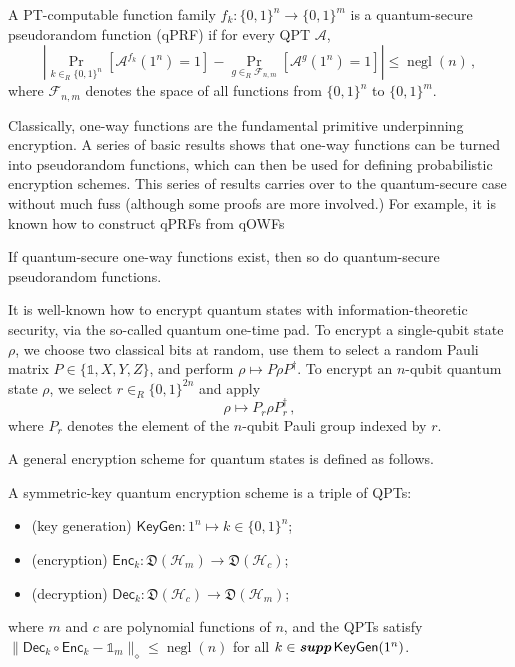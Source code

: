 \documentclass[envcountsame]{llncs}
\numberwithin{equation}{section}
\newcommand{\one}{\mathds 1}
\newcommand{\opn}{\operatorname}
\newcommand{\algo}{\mathcal}
\newcommand{\negl}{\opn{negl}}
\newcommand{\KeyGen}{\ensuremath{\mathsf{KeyGen}}\xspace}
\newcommand{\Enc}{\ensuremath{\mathsf{Enc}}\xspace}
\newcommand{\Dec}{\ensuremath{\mathsf{Dec}}\xspace}
\newcommand{\inrand}{\in_R}
\newcommand{\prob}{\opn{Pr}}
\newcommand{\states}{\mathfrak D}
\newcommand\supp{\textbf{supp}}
\begin{document}
\begin{definition}\label{def:quantum-secure-prf}
A PT-computable function family $f_k : \{0,1\}^n \rightarrow \{0, 1\}^m$ is a quantum-secure pseudorandom function (qPRF) if for every QPT $\algo A$, 
$$
\left|\prob_{k \inrand \{0, 1\}^n} [\algo A^{f_k}(1^n) = 1] - \prob_{g \inrand \mathcal F_{n, m}}[ \algo A^g(1^n) = 1]\right|
\leq \negl(n)\,,
$$
where $\mathcal F_{n, m}$ denotes the space of all functions from $\{0,1\}^n$ to $\{0,1\}^m$.
\end{definition}

Classically, one-way functions are the fundamental primitive underpinning encryption. A series of basic results shows that one-way functions can be turned into pseudorandom functions, which can then be used for defining probabilistic encryption schemes. This series of results carries over to the quantum-secure case without much fuss (although some proofs are more involved.) For example, it is known how to construct qPRFs from qOWFs 
\begin{theorem}\cite{HILL99, Zhandry2012}
\label{thm:qOWF-implies-qPRF}If quantum-secure one-way functions exist, then so do quantum-secure pseudorandom functions.
\end{theorem}

It is well-known how to encrypt quantum states with information-theoretic security, via the so-called quantum one-time pad. To encrypt a single-qubit state $\rho$, we choose two classical bits at random, use them to select a random Pauli matrix $P \in \{\one, X, Y, Z\}$, and perform $\rho \mapsto P \rho P^\dagger$. To encrypt an $n$-qubit quantum state $\rho$, we select $r \inrand \{0,1\}^{2n}$ and apply
\begin{equation}\label{eq:quantum-one-time-pad}
\rho \longmapsto P_r \rho P_r^\dagger\,,
\end{equation}
where $P_r$ denotes the element of the $n$-qubit Pauli group indexed by $r$. 

A general encryption scheme for quantum states is defined as follows.

\begin{definition}\label{def:encryption-scheme}
A symmetric-key quantum encryption scheme is a triple of QPTs:
\begin{itemize}
\item (key generation) $\KeyGen : 1^n \longmapsto k \in \{0, 1\}^n$;
\item (encryption) $\Enc_k : \states (\mathcal H_m) \longrightarrow \states (\mathcal H_c)$;
\item (decryption) $\Dec_k : \states (\mathcal H_c) \longrightarrow \states (\mathcal H_m)$;
\end{itemize}
where $m$ and $c$ are polynomial functions of $n$, and the QPTs satisfy $\| \Dec_k \circ \Enc_k - \one_m \|_\diamond \leq \negl(n)$ for all $k \in \emph{\supp}\,\KeyGen(1^n)$.
\end{definition}
\end{document}
